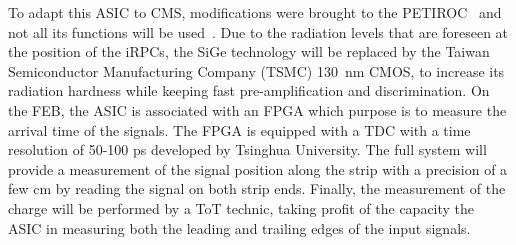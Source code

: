 	To adapt this ASIC to CMS, modifications were brought to the PETIROC~\cite{PHASEIITP} and not all its functions will be used~\cite{COMBARET2018}. Due to the radiation levels that are foreseen at the position of the iRPCs, the SiGe technology will be replaced by the Taiwan Semiconductor Manufacturing Company (TSMC) \SI{130}{nm} CMOS, to increase its radiation hardness while keeping fast pre-amplification and discrimination. On the \acl{FEB}, the ASIC is associated with an FPGA which purpose is to measure the arrival time of the signals. The FPGA is equipped with a TDC with a time resolution of 50-100 \si{ps} developed by Tsinghua University. The full system will provide a measurement of the signal position along the strip with a precision of a few \si{cm} by reading the signal on both strip ends. Finally, the measurement of the charge will be performed by a \acf{ToT} technic, taking profit of the capacity the ASIC in measuring both the leading and trailing edges of the input signals.
	
	\newpage

